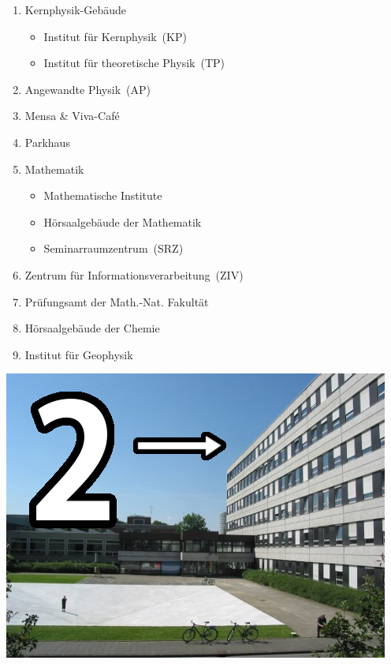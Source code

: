 {\begin{minipage}{0.54\textwidth}
	\begin{enumerate}[resume*=lageplan]
		\item Kernphysik-Gebäude
		\begin{itemize}
			\item Institut für Kernphysik~(KP)
			\item Institut für theoretische Physik~(TP)
		\end{itemize}
		\item Angewandte Physik~(AP)
		\item Mensa \& Viva-Café
		\item Parkhaus
		\item Mathematik
		\begin{itemize}
			\item Mathematische Institute
			\item Hörsaalgebäude der Mathematik
			\item Seminarraumzentrum~(SRZ)
		\end{itemize}
		\item Zentrum für Informationsverarbeitung~(ZIV)
		\item Prüfungsamt der Math.-Nat. Fakultät
		\item Hörsaalgebäude der Chemie
		\item Institut für Geophysik
	\end{enumerate}
\end{minipage}
\hfill
\begin{minipage}{0.45\textwidth}
	\vspace{-0.5cm}
	\centering
	\includegraphics[width=\textwidth]{res/lageplan/2_KP_TP.jpg}
\end{minipage}

}
